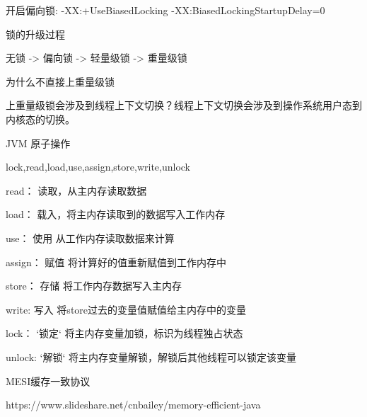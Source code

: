 开启偏向锁: -XX:+UseBiasedLocking -XX:BiasedLockingStartupDelay=0

锁的升级过程


无锁 -> 偏向锁 -> 轻量级锁  -> 重量级锁


为什么不直接上重量级锁

上重量级锁会涉及到线程上下文切换？线程上下文切换会涉及到操作系统用户态到内核态的切换。



JVM 原子操作

lock,read,load,use,assign,store,write,unlock


read： 读取，从主内存读取数据

load： 载入，将主内存读取到的数据写入工作内存

use： 使用 从工作内存读取数据来计算

assign： 赋值 将计算好的值重新赋值到工作内存中

store： 存储 将工作内存数据写入主内存

write: 写入 将store过去的变量值赋值给主内存中的变量

lock： `锁定` 将主内存变量加锁，标识为线程独占状态

unlock: `解锁` 将主内存变量解锁，解锁后其他线程可以锁定该变量




MESI缓存一致协议








https://www.slideshare.net/cnbailey/memory-efficient-java

